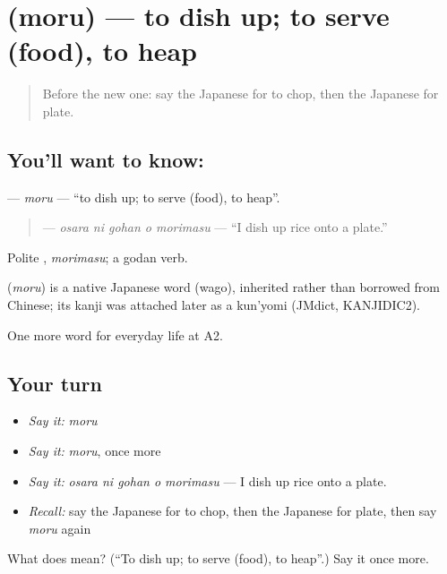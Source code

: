 \section[\texorpdfstring{\ja{もる} (moru)}{もる (moru)}]{ (moru) — to dish up; to serve (food), to heap}

\label{lesson:JA-C174-moru}



\begin{quote}
Before the new one: say the Japanese for to chop, then the Japanese for plate.
\end{quote}

\subsection*{You'll want to know: }
\textbf{} — \emph{moru} — \textquotedblleft{}to dish up; to serve (food), to heap\textquotedblright{}.

\begin{quote}
\textbf{  } — \emph{osara ni gohan o morimasu} — \textquotedblleft{}I dish up rice onto a plate.\textquotedblright{}
\end{quote}

Polite \textbf{}, \emph{morimasu}; a godan verb.

\begin{cousinweb}
\textbf{} (\emph{moru}) is a native Japanese word (wago), inherited rather than borrowed from Chinese; its kanji was attached later as a kun'yomi (JMdict, KANJIDIC2).
\end{cousinweb}

\begin{grammarlens}[title={What you've built}]
One more word for everyday life at A2.
\end{grammarlens}

\subsection*{Your turn}
\begin{itemize}
\raggedright
  \item \emph{Say it:} \emph{moru}
  \item \emph{Say it:} \emph{moru}, once more
  \item \emph{Say it:} \emph{osara ni gohan o morimasu} — I dish up rice onto a plate.
  \item \emph{Recall:} say the Japanese for to chop, then the Japanese for plate, then say \emph{moru} again
\end{itemize}

\begin{tcolorbox}[breakable,colback=teal!4,colframe=teal!35!black,title={Before you move on}]
What does  mean? (\textquotedblleft{}To dish up; to serve (food), to heap\textquotedblright{}.) Say it once more.
\end{tcolorbox}
